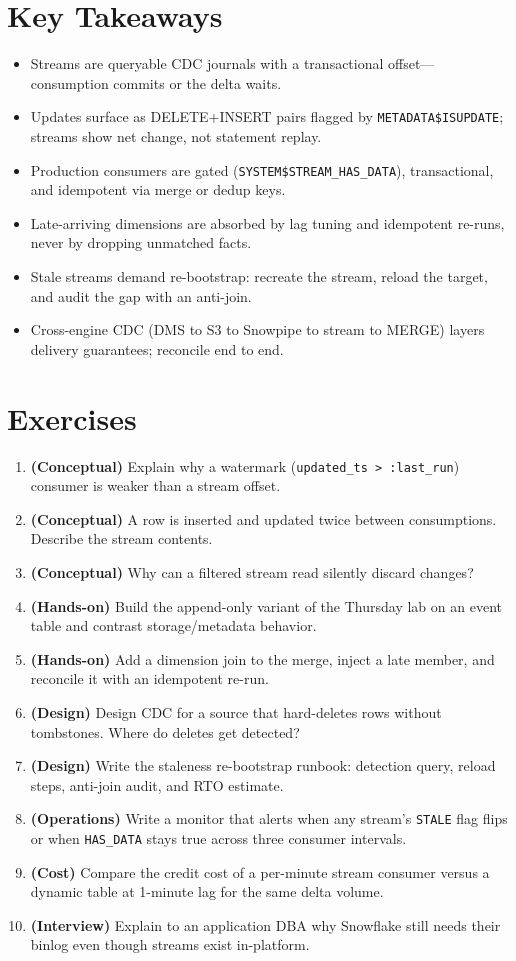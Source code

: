 \section*{Key Takeaways}
\begin{itemize}
    \item Streams are queryable CDC journals with a transactional offset---consumption commits or the delta waits.
    \item Updates surface as DELETE+INSERT pairs flagged by \texttt{METADATA\$ISUPDATE}; streams show net change, not statement replay.
    \item Production consumers are gated (\texttt{SYSTEM\$STREAM\_HAS\_DATA}), transactional, and idempotent via merge or dedup keys.
    \item Late-arriving dimensions are absorbed by lag tuning and idempotent re-runs, never by dropping unmatched facts.
    \item Stale streams demand re-bootstrap: recreate the stream, reload the target, and audit the gap with an anti-join.
    \item Cross-engine CDC (DMS to S3 to Snowpipe to stream to MERGE) layers delivery guarantees; reconcile end to end.
\end{itemize}

\section{Exercises}
\begin{enumerate}
    \item \textbf{(Conceptual)} Explain why a watermark (\texttt{updated\_ts > :last\_run}) consumer is weaker than a stream offset.
    \item \textbf{(Conceptual)} A row is inserted and updated twice between consumptions. Describe the stream contents.
    \item \textbf{(Conceptual)} Why can a filtered stream read silently discard changes?
    \item \textbf{(Hands-on)} Build the append-only variant of the Thursday lab on an event table and contrast storage/metadata behavior.
    \item \textbf{(Hands-on)} Add a dimension join to the merge, inject a late member, and reconcile it with an idempotent re-run.
    \item \textbf{(Design)} Design CDC for a source that hard-deletes rows without tombstones. Where do deletes get detected?
    \item \textbf{(Design)} Write the staleness re-bootstrap runbook: detection query, reload steps, anti-join audit, and RTO estimate.
    \item \textbf{(Operations)} Write a monitor that alerts when any stream's \texttt{STALE} flag flips or when \texttt{HAS\_DATA} stays true across three consumer intervals.
    \item \textbf{(Cost)} Compare the credit cost of a per-minute stream consumer versus a dynamic table at 1-minute lag for the same delta volume.
    \item \textbf{(Interview)} Explain to an application DBA why Snowflake still needs their binlog even though streams exist in-platform.
\end{enumerate}
